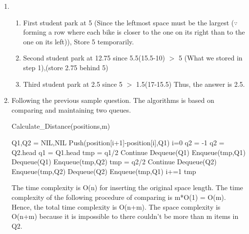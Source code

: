 \documentclass{article}
\begin{document}
\begin{CJK*}{UTF8}{bsmi}
\begin{enumerate}
    \item \begin{enumerate}
        \item First student park at 5 (Since the leftmost space must be the largest ($\because$ forming a row where each bike is closer to the one on its right than to the one on its left)), Store 5 temporarily.
        \item Second student park at 12.75 since 5.5(15.5-10) $>$ 5 (What we stored in step 1),(store 2.75 behind 5)
        \item Third student park at 2.5 since 5 $>$ 1.5(17-15.5)
        Thus, the answer is 2.5.
    \end{enumerate} 
    

    \item  Following the previous sample question. The algorithms is based on comparing and maintaining two queues.
    \begin{algorithm} [H]
        \caption{Calculate\_Distance(positions,m)}
        \begin{algorithmic}
        \State Q1,Q2 = NIL,NIL 
            \State Push(position[i+1]-position[i],Q1) 
        \EndFor
        \State i=0
         
                \State q2 = -1
            \Else
                \State q2 = Q2.head
                \State q1 = Q1.head
            \EndIf
                \State tmp = q1/2
                 
                \State Continue 
                \State Dequeue(Q1)
                \State Enqueue(tmp,Q1) 
                \Else
                \State Dequeue(Q1)
                \State Enqueue(tmp,Q2) 
                \EndIf
            \Else 
                \State tmp = q2/2
                 
                \State Continue 
                \State Dequeue(Q2)
                \State Enqueue(tmp,Q2) 
                \Else
                \State Dequeue(Q2)
                \State Enqueue(tmp,Q1) 
                \EndIf
            \EndIf
            \State i+=1
        \EndWhile
        \State \Return tmp
        \end{algorithmic}
        \end{algorithm}

        The time complexity is O(n) for inserting the original space length. The time complexity of the following procedure of comparing is m*O(1) = O(m). Hence, the total time complexity is O(n+m).
        The space complexity is O(n+m) because it is impossible to there couldn't be more than m items in Q2. 
\end{enumerate}

\end{CJK*}
\end{document}
